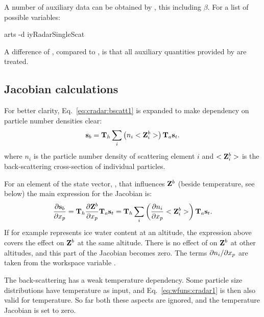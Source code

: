 A number of auxiliary data can be obtained by , this
including $\beta$. For a list of possible variables:
\begin{code}
arts -d iyRadarSingleScat
\end{code}
A difference of , compared to , is
that all auxiliary quantities provided by  are
treated.



\subsection{Jacobian calculations}
\label{sec:cradar:jac}

For better clarity, Eq.~\ref{eq:cradar:bscatt1} is expanded to make dependency
on particle number densities clear:
\begin{equation}
  {\bf s}_{b} = {\bf T}_{h}\sum_i\left(n_i<{\bf Z}^b_i>\right){\bf T}_{a}{\bf s}_{t}.
\end{equation}
where $n_i$ is the particle number density of scattering element $i$ and
$<{\bf Z}^b_i>$ is the back-scattering cross-section of individual particles.

For an element of the state vector, , that influences ${\bf Z}^b$
(beside temperature, see below) the main expression for the Jacobian is:
\begin{equation}
  \frac{\partial{\bf s}_{b}}{\partial x_{p}} = {\bf T}_{h}
    \frac{\partial{\bf Z}^b}{\partial x_{p}}{\bf T}_{a}{\bf s}_{t} = 
    {\bf T}_{h} \sum_i\left(\frac{\partial n_i}{\partial x_{p}}<{\bf Z}^b_i>\right)
    {\bf T}_{a}{\bf s}_{t}.
  \label{eq:wfuns:cradar1}
\end{equation}
If for example  represents ice water content at an altitude, the
expression above covers the effect on ${\bf Z}^b$ at the same altitude. There
is no effect of  on ${\bf Z}^b$ at other altitudes, and this part of
the Jacobian becomes zero. The terms $\partial n_i/\partial x_{p}$ are
taken from the workspace variable .

The back-scattering has a weak temperature dependency. Some particle size
distributions have temperature as input, and Eq.~\ref{eq:wfuns:cradar1} is then
also valid for temperature. So far both these aspects are ignored, and the
temperature Jacobian is set to zero.

